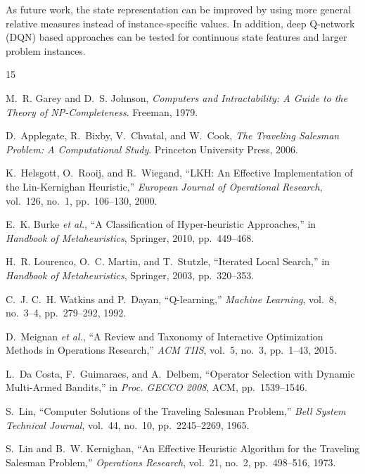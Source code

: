 \documentclass[10pt,twocolumn]{article}
\begin{document}
As future work, the state representation can be improved by using more
general relative measures instead of instance-specific values. In addition,
deep Q-network (DQN) based approaches can be tested for continuous state
features and larger problem instances.


\begin{thebibliography}{15}

M.~R. Garey and D.~S. Johnson,
\textit{Computers and Intractability: A Guide to the Theory of NP-Completeness}.
Freeman, 1979.

D.~Applegate, R.~Bixby, V.~Chvatal, and W.~Cook,
\textit{The Traveling Salesman Problem: A Computational Study}.
Princeton University Press, 2006.

K.~Helsgott, O.~Rooij, and R.~Wiegand,
``LKH: An Effective Implementation of the Lin-Kernighan Heuristic,''
\textit{European Journal of Operational Research}, vol.~126, no.~1, pp.~106--130, 2000.

E.~K. Burke \textit{et al.},
``A Classification of Hyper-heuristic Approaches,''
in \textit{Handbook of Metaheuristics}, Springer, 2010, pp.~449--468.

H.~R. Lourenco, O.~C. Martin, and T.~Stutzle,
``Iterated Local Search,''
in \textit{Handbook of Metaheuristics}, Springer, 2003, pp.~320--353.

C.~J. C.~H. Watkins and P.~Dayan,
``Q-learning,''
\textit{Machine Learning}, vol.~8, no.~3--4, pp.~279--292, 1992.

D.~Meignan \textit{et al.},
``A Review and Taxonomy of Interactive Optimization Methods in Operations Research,''
\textit{ACM TIIS}, vol.~5, no.~3, pp.~1--43, 2015.

L.~Da Costa, F.~Guimaraes, and A.~Delbem,
``Operator Selection with Dynamic Multi-Armed Bandits,''
in \textit{Proc. GECCO 2008}, ACM, pp.~1539--1546.

S.~Lin,
``Computer Solutions of the Traveling Salesman Problem,''
\textit{Bell System Technical Journal}, vol.~44, no.~10, pp.~2245--2269, 1965.

S.~Lin and B.~W. Kernighan,
``An Effective Heuristic Algorithm for the Traveling Salesman Problem,''
\textit{Operations Research}, vol.~21, no.~2, pp.~498--516, 1973.


\end{thebibliography}
\end{document}

